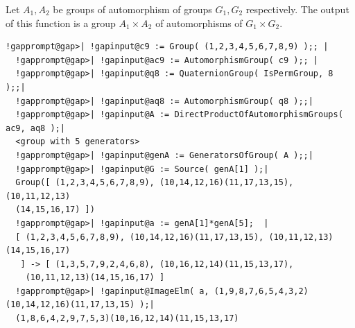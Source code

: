 \documentclass[a4paper,11pt]{report}
\begin{document}
{{{ Let $A_1,A_2$ be groups of automorphism of groups $G_1,G_2$ respectively. The output of this function is a group $A_1 \times A_2$ of automorphisms of $G_1 \times G_2$. 

 
\begin{Verbatim}[commandchars=!@|,fontsize=\small,frame=single,label=Example]
  !gapprompt@gap>| !gapinput@c9 := Group( (1,2,3,4,5,6,7,8,9) );; |
  !gapprompt@gap>| !gapinput@ac9 := AutomorphismGroup( c9 );; |
  !gapprompt@gap>| !gapinput@q8 := QuaternionGroup( IsPermGroup, 8 );;|
  !gapprompt@gap>| !gapinput@aq8 := AutomorphismGroup( q8 );;|
  !gapprompt@gap>| !gapinput@A := DirectProductOfAutomorphismGroups( ac9, aq8 );|
  <group with 5 generators>
  !gapprompt@gap>| !gapinput@genA := GeneratorsOfGroup( A );;|
  !gapprompt@gap>| !gapinput@G := Source( genA[1] );|
  Group([ (1,2,3,4,5,6,7,8,9), (10,14,12,16)(11,17,13,15), (10,11,12,13)
  (14,15,16,17) ])
  !gapprompt@gap>| !gapinput@a := genA[1]*genA[5];  |
  [ (1,2,3,4,5,6,7,8,9), (10,14,12,16)(11,17,13,15), (10,11,12,13)(14,15,16,17) 
   ] -> [ (1,3,5,7,9,2,4,6,8), (10,16,12,14)(11,15,13,17), 
    (10,11,12,13)(14,15,16,17) ]
  !gapprompt@gap>| !gapinput@ImageElm( a, (1,9,8,7,6,5,4,3,2)(10,14,12,16)(11,17,13,15) );|
  (1,8,6,4,2,9,7,5,3)(10,16,12,14)(11,15,13,17)
\end{Verbatim}
 }

 }

 }

         
\end{document}
